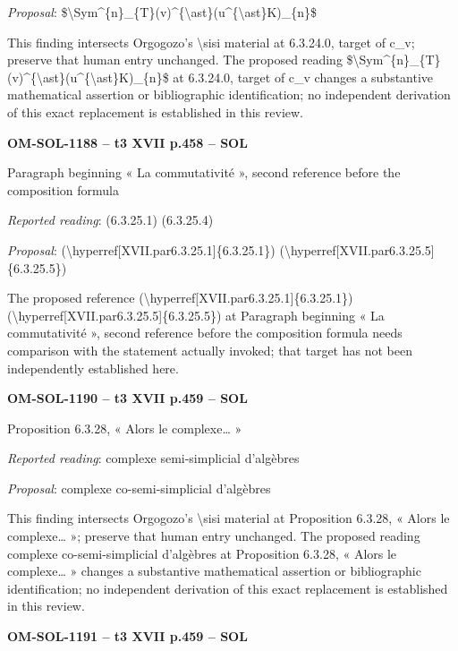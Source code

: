 \emph{Proposal}: \$\textbackslash{}Sym\textasciicircum{}\{n\}\_\{T\}(v)\textasciicircum{}\{\textbackslash{}ast\}(u\textasciicircum{}\{\textbackslash{}ast\}K)\_\{n\}\$\par
This finding intersects Orgogozo's \textbackslash{}sisi material at 6.3.24.0, target of c\_v; preserve that human entry unchanged. The proposed reading \$\textbackslash{}Sym\textasciicircum{}\{n\}\_\{T\}(v)\textasciicircum{}\{\textbackslash{}ast\}(u\textasciicircum{}\{\textbackslash{}ast\}K)\_\{n\}\$ at 6.3.24.0, target of c\_v changes a substantive mathematical assertion or bibliographic identification; no independent derivation of this exact replacement is established in this review.\par
\par\noindent\textbf{OM-SOL-1188 -- t3 XVII p.458 -- SOL}\par
Paragraph beginning « La commutativité », second reference before the composition formula\par
\emph{Reported reading}: (6.3.25.1) (6.3.25.4)\par
\emph{Proposal}: (\textbackslash{}hyperref[XVII.par6.3.25.1]\{6.3.25.1\}) (\textbackslash{}hyperref[XVII.par6.3.25.5]\{6.3.25.5\})\par
The proposed reference (\textbackslash{}hyperref[XVII.par6.3.25.1]\{6.3.25.1\}) (\textbackslash{}hyperref[XVII.par6.3.25.5]\{6.3.25.5\}) at Paragraph beginning « La commutativité », second reference before the composition formula needs comparison with the statement actually invoked; that target has not been independently established here.\par
\par\noindent\textbf{OM-SOL-1190 -- t3 XVII p.459 -- SOL}\par
Proposition 6.3.28, « Alors le complexe… »\par
\emph{Reported reading}: complexe semi-simplicial d'algèbres\par
\emph{Proposal}: complexe co-semi-simplicial d'algèbres\par
This finding intersects Orgogozo's \textbackslash{}sisi material at Proposition 6.3.28, « Alors le complexe… »; preserve that human entry unchanged. The proposed reading complexe co-semi-simplicial d'algèbres at Proposition 6.3.28, « Alors le complexe… » changes a substantive mathematical assertion or bibliographic identification; no independent derivation of this exact replacement is established in this review.\par
\par\noindent\textbf{OM-SOL-1191 -- t3 XVII p.459 -- SOL}\par
